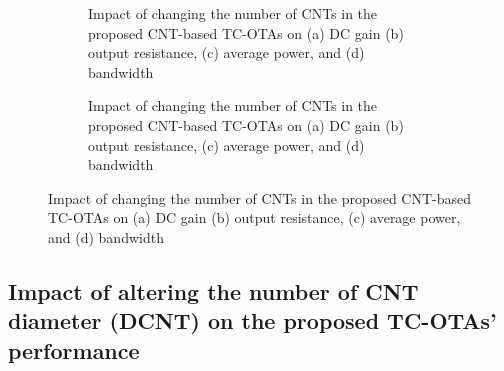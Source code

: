 \begin{figure}[htbp]
  \centering
  \begin{subfigure}[b]{0.48\linewidth}
    \centering
    \caption{Impact of changing the number of CNTs in the proposed CNT-based TC-OTAs on (a) DC gain (b) output resistance, (c) average power, and (d) bandwidth}

  \end{subfigure}
  \hfill
  \begin{subfigure}[b]{0.48\linewidth}
    \centering
    \caption{Impact of changing the number of CNTs in the proposed CNT-based TC-OTAs on (a) DC gain (b) output resistance, (c) average power, and (d) bandwidth}

  \end{subfigure}
  \caption{Impact of changing the number of CNTs in the proposed CNT-based TC-OTAs on (a) DC gain (b) output resistance, (c) average power, and (d) bandwidth}

  \label{fig:group_us7eu}
\end{figure}

\subsection*{Impact of altering the number of CNT diameter (DCNT) on the proposed TC-OTAs' performance}

